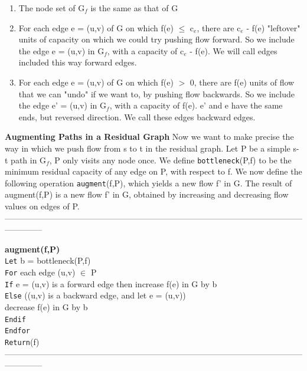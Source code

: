 \documentclass{article}
\begin{document}
\begin{enumerate}
    \item The node set of G$_f$ is the same as that of G
    \item For each edge e = (u,v) of G on which f(e) $\le$ c$_e$, there are c$_e$ - f(e) "leftover" units of capacity on which we could try pushing flow forward. So we include the edge e = (u,v) in G$_f$, with a capacity of c$_e$ - f(e). We will call edges included this way forward edges.
    \item For each edge e = (u,v) of G on which f(e) $>$ 0, there are f(e) units of flow that we can "undo" if we want to, by pushing flow backwards. So we include the edge e' = (u,v) in G$_f$, with a capacity of f(e). e' and e have the same ends, but reversed direction. We call these edges backward edges.
\end{enumerate}

\textbf{Augmenting Paths in a Residual Graph} Now we want to make precise the way in which we push flow from s to t in the residual graph. Let P be a simple s-t path in G$_f$, P only visits any node once. We define \texttt{bottleneck}(P,f) to be the minimum residual capacity of any edge on P, with respect to f. We now define the following operation \texttt{augment}(f,P), which yields a new flow f' in G. The result of augment(f,P) is a new flow f' in G, obtained by increasing and decreasing flow values on edges of P. \\

\medskip
--------------------------------------------------------------------------------------------------------------------------
\medskip

\textbf{augment(f,P)}\\
\texttt{Let} b = bottleneck(P,f)\\
\texttt{For} each edge (u,v) $\in$ P\\
\texttt{If} e = (u,v) is a forward edge then increase f(e) in G by b\\
\texttt{Else} ((u,v) is a backward edge, and let e = (u,v))\\
decrease f(e) in G by b\\
\texttt{Endif}\\
\texttt{Endfor}\\
\texttt{Return}(f)\\


\medskip
--------------------------------------------------------------------------------------------------------------------------
\medskip
\end{document}

